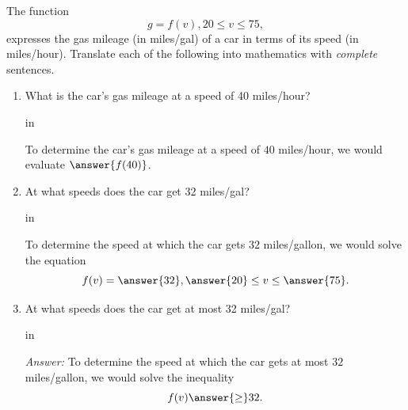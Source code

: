 \documentclass{ximera}
\newcommand{\pskip}{\vskip 0.1 in}
\begin{document}
\begin{example}  \label{ExFun15}

The function
\[
   g = f(v) , 20 \leq v \leq 75 ,
\]
expresses the gas mileage (in miles/gal) of a car in terms of its speed (in miles/hour). Translate each of the following into mathematics with \emph{complete} sentences.

\begin{enumerate}


\item What is the car's gas mileage at a speed of 40 miles/hour?

\pskip

\begin{hint}
To determine the car's gas mileage at a speed of $40$ miles/hour, we would evaluate $\answer{f(40)}$.
\end{hint}


\item At what speeds does the car get 32 miles/gal?


\pskip

\begin{hint}
To determine the speed at which the car gets $32$ miles/gallon, we would solve the equation
\[
    f(v) = \answer{32} , \answer{20} \leq v \leq \answer{75}.
\]
\end{hint}


\item At what speeds does the car get at most 32 miles/gal?

\pskip

\emph{Answer:} To determine the speed at which the car gets at most $32$ miles/gallon, we would solve the inequality
\[
    f(v) \answer{\geq} 32 .
\]






\end{enumerate}
\end{example}
\end{document}
